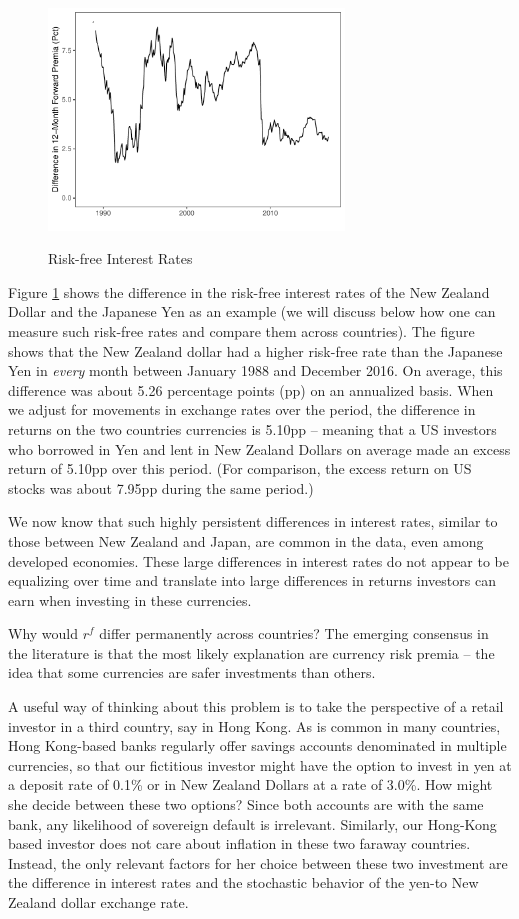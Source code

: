 \documentclass{ar-1col}
\begin{document}
\begin{figure}
  \centering
  \caption{Risk-free Interest Rates}
  \includegraphics[width=0.7\textwidth]{Exhibits/Figure_FP12M_DiffJPYNZD.pdf}
  \label{fig:fp}
\end{figure}
Figure \ref{fig:fp} shows the difference in the risk-free interest rates of the New Zealand Dollar and the Japanese Yen as an example (we will discuss below how one can measure such risk-free rates and compare them across countries). The figure shows that the New Zealand dollar had a higher risk-free rate than the Japanese Yen in \textit{every} month between January 1988 and December 2016. On average, this difference was about 5.26 percentage points (pp) on an annualized basis. When we adjust for movements in exchange rates over the period, the difference in returns on the two countries currencies is 5.10pp -- meaning that a US investors who borrowed in Yen and lent in New Zealand Dollars on average made an excess return of 5.10pp over this period. (For comparison, the excess return on US stocks was about 7.95pp during the same period.)

We now know that such highly persistent differences in interest rates, similar to those between New Zealand and Japan, are common in the data, even among developed economies. These large differences in interest rates do not appear to be equalizing over time and translate into large differences in returns investors can earn when investing in these currencies.

Why would $r^f$ differ permanently across countries? The emerging consensus in the literature is that the most likely explanation are currency risk premia -- the idea that some currencies are safer investments than others.

A useful way of thinking about this problem is to take the perspective of a retail investor in a third country, say in Hong Kong. As is common in many countries, Hong Kong-based banks regularly offer savings accounts denominated in multiple currencies, so that our fictitious investor might have the option to invest in yen at a deposit rate of 0.1\% or in New Zealand Dollars at a rate of 3.0\%. How might she decide between these two options? Since both accounts are with the same bank, any likelihood of sovereign default is irrelevant. Similarly, our Hong-Kong based investor does not care about inflation in these two faraway countries. Instead, the only relevant factors for her choice between these two investment are the difference in interest rates and the stochastic behavior of the yen-to New Zealand dollar exchange rate.
\end{document}
